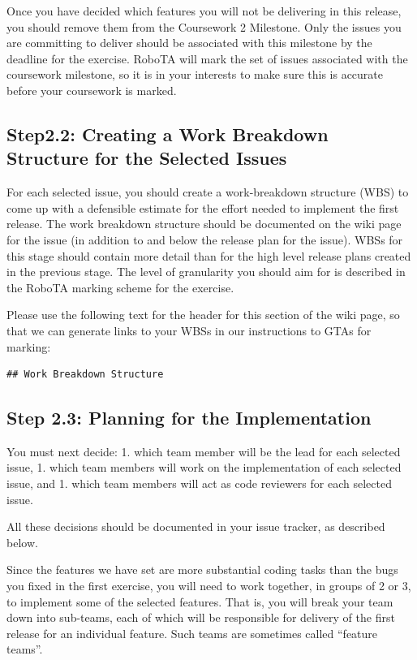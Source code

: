 \documentclass[
]{book}
\begin{document}
Once you have decided which features you will not be delivering in this release, you should remove them from the Coursework 2 Milestone. Only the issues you are committing to deliver should be associated with this milestone by the deadline for the exercise. RoboTA will mark the set of issues associated with the coursework milestone, so it is in your interests to make sure this is accurate before your coursework is marked.

\hypertarget{step2.2-creating-a-work-breakdown-structure-for-the-selected-issues}{%
\subsection{Step2.2: Creating a Work Breakdown Structure for the Selected Issues}\label{step2.2-creating-a-work-breakdown-structure-for-the-selected-issues}}

For each selected issue, you should create a work-breakdown structure (WBS) to come up with a defensible estimate for the effort needed to implement the first release. The work breakdown structure should be documented on the wiki page for the issue (in addition to and below the release plan for the issue). WBSs for this stage should contain more detail than for the high level release plans created in the previous stage. The level of granularity you should aim for is described in the RoboTA marking scheme for the exercise.

Please use the following text for the header for this section of the wiki page, so that we can generate links to your WBSs in our instructions to GTAs for marking:

\begin{verbatim}
## Work Breakdown Structure
\end{verbatim}

\hypertarget{plimp}{%
\subsection{Step 2.3: Planning for the Implementation}\label{plimp}}

You must next decide:
1. which team member will be the lead for each selected issue,
1. which team members will work on the implementation of each selected issue, and
1. which team members will act as code reviewers for each selected issue.

All these decisions should be documented in your issue tracker, as described below.

Since the features we have set are more substantial coding tasks than the bugs you fixed in the first exercise, you will need to work together, in groups of 2 or 3, to implement some of the selected features. That is, you will break your team down into sub-teams, each of which will be responsible for delivery of the first release for an individual feature. Such teams are sometimes called ``feature teams''.
\end{document}
